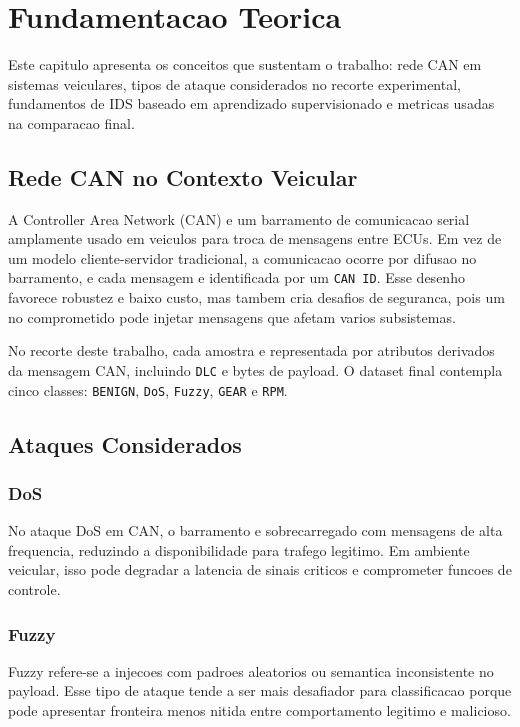 \chapter{Fundamentacao Teorica}

Este capitulo apresenta os conceitos que sustentam o trabalho: rede CAN em sistemas veiculares, tipos de ataque considerados no recorte experimental, fundamentos de IDS baseado em aprendizado supervisionado e metricas usadas na comparacao final.

\section{Rede CAN no Contexto Veicular}

A Controller Area Network (CAN) e um barramento de comunicacao serial amplamente usado em veiculos para troca de mensagens entre ECUs. Em vez de um modelo cliente-servidor tradicional, a comunicacao ocorre por difusao no barramento, e cada mensagem e identificada por um \texttt{CAN ID}. Esse desenho favorece robustez e baixo custo, mas tambem cria desafios de seguranca, pois um no comprometido pode injetar mensagens que afetam varios subsistemas.

No recorte deste trabalho, cada amostra e representada por atributos derivados da mensagem CAN, incluindo \texttt{DLC} e bytes de payload. O dataset final contempla cinco classes: \texttt{BENIGN}, \texttt{DoS}, \texttt{Fuzzy}, \texttt{GEAR} e \texttt{RPM}.

\section{Ataques Considerados}

\subsection{DoS}

No ataque DoS em CAN, o barramento e sobrecarregado com mensagens de alta frequencia, reduzindo a disponibilidade para trafego legitimo. Em ambiente veicular, isso pode degradar a latencia de sinais criticos e comprometer funcoes de controle.

\subsection{Fuzzy}

Fuzzy refere-se a injecoes com padroes aleatorios ou semantica inconsistente no payload. Esse tipo de ataque tende a ser mais desafiador para classificacao porque pode apresentar fronteira menos nitida entre comportamento legitimo e malicioso.

